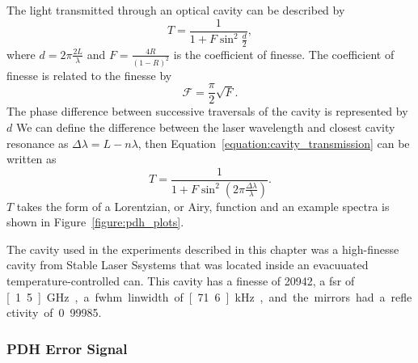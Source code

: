 {The light transmitted through an optical cavity can be described by~\cite{pedrotti_introduction_2007}
\begin{equation}\label{equation:cavity_transmission}
T = \frac{1}{1+F\sin^2\frac{d}{2}},
\end{equation}
where $d=2\pi\frac{2L}{\lambda}$ and $F=\frac{4R}{\left(1-R\right)^2}$ is the coefficient of finesse.
The coefficient of finesse is related to the finesse by
\begin{equation}
\mathscr{F}=\frac{\pi}{2}\sqrt{F}.
\end{equation}
The phase difference between successive traversals of the cavity is represented by $d$
We can define the difference between the laser wavelength and closest cavity resonance as $\Delta\lambda=L-n\lambda$, then Equation~\ref{equation:cavity_transmission} can be written as
\begin{equation}\label{equation:cavity_transmission2}
T = \frac{1}{1+F\sin^2\left(2\pi\frac{\Delta\lambda}{\lambda}\right)}.
\end{equation}
$T$ takes the form of a Lorentzian, or Airy, function and an example spectra is shown in Figure~\ref{figure:pdh_plots}.

The cavity used in the experiments described in this chapter was a high-finesse cavity from Stable Laser Ssystems that was located inside an evacuuated temperature-controlled can.
This cavity has a finesse of 20942, a \gls{fsr} of \unit[1.5]{GHz}, a \gls{fwhm} linwidth of \unit[71.6]{kHz}, and the mirrors had a reflectivity of 0.99985.

\subsubsection{PDH Error Signal}

}
